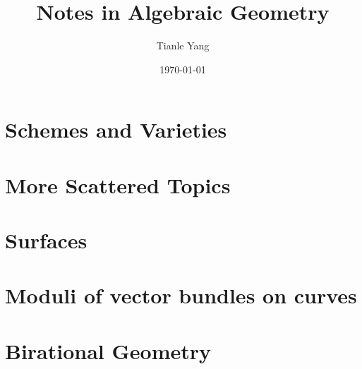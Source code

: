 \documentclass[sectionlevel=book]{noteformyself}
\title{Notes in Algebraic Geometry}
\author{Tianle Yang}
\date{\today}
\begin{document}
    \maketitle

    \frontmatter

    \tableofcontents

    \mainmatter

    \chapter{Schemes and Varieties}
        
        
        
        
        

    \chapter{More Scattered Topics}

    \chapter{Surfaces}
        
        
        
        
        
        
        

    \chapter{Moduli of vector bundles on curves}
        

    \chapter{Birational Geometry}
        
        
        
\end{document}
